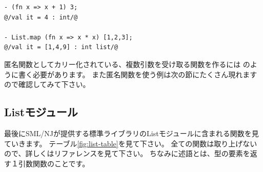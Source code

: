 \documentclass[11pt,a4paper]{article}
\begin{document}
\begin{lstlisting}[caption=匿名関数,label=code:anonymous]
- (fn x => x + 1) 3;
@/val it = 4 : int/@

- List.map (fn x => x * x) [1,2,3];
@/val it = [1,4,9] : int list/@
\end{lstlisting}

匿名関数としてカリー化されている、複数引数を受け取る関数を作るには
のように書く必要があります。
また匿名関数を使う例は次の節にたくさん現れますので確認してみて下さい。

\subsection{Listモジュール}

最後にSML/NJが提供する標準ライブラリのListモジュールに含まれる関数を見ていきます。
テーブル\ref{fig:list-table}を見て下さい。
全ての関数は取り上げないので、詳しくはリファレンスを見て下さい\cite{sml-libs}。
ちなみに述語とは、型の要素を返す１引数関数のことです。
\end{document}
